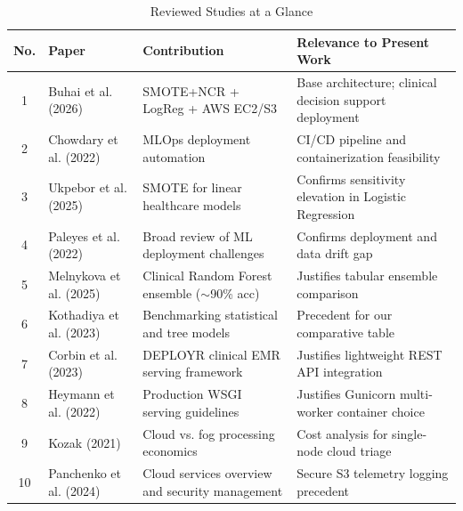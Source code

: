\documentclass[10pt,journal,compsoc]{IEEEtran}
\begin{document}
\begin{table}[t]
\caption{Reviewed Studies at a Glance}
\label{tab:reviewed_studies}
\centering
\begin{tabular}{|c|p{4.0cm}|p{5.8cm}|p{6.0cm}|}
\hline
\textbf{No.} & \textbf{Paper} & \textbf{Contribution} & \textbf{Relevance to Present Work} \\
\hline
1 & Buhai et al. (2026)~\cite{buhai2026} & SMOTE+NCR + LogReg + AWS EC2/S3 & Base architecture; clinical decision support deployment \\
\hline
2 & Chowdary et al. (2022)~\cite{chowdary2022} & MLOps deployment automation & CI/CD pipeline and containerization feasibility \\
\hline
3 & Ukpebor et al. (2025)~\cite{ukpebor2025} & SMOTE for linear healthcare models & Confirms sensitivity elevation in Logistic Regression \\
\hline
4 & Paleyes et al. (2022)~\cite{paleyes2022} & Broad review of ML deployment challenges & Confirms deployment and data drift gap \\
\hline
5 & Melnykova et al. (2025)~\cite{melnykova2025} & Clinical Random Forest ensemble ($\sim$90\% acc) & Justifies tabular ensemble comparison \\
\hline
6 & Kothadiya et al. (2023)~\cite{kothadiya2023} & Benchmarking statistical and tree models & Precedent for our comparative table \\
\hline
7 & Corbin et al. (2023)~\cite{corbin2023} & DEPLOYR clinical EMR serving framework & Justifies lightweight REST API integration \\
\hline
8 & Heymann et al. (2022)~\cite{heymann2022} & Production WSGI serving guidelines & Justifies Gunicorn multi-worker container choice \\
\hline
9 & Kozak (2021)~\cite{kozak2021} & Cloud vs. fog processing economics & Cost analysis for single-node cloud triage \\
\hline
10 & Panchenko et al. (2024)~\cite{panchenko2024} & Cloud services overview and security management & Secure S3 telemetry logging precedent \\
\hline
\end{tabular}
\end{table}
\end{document}
